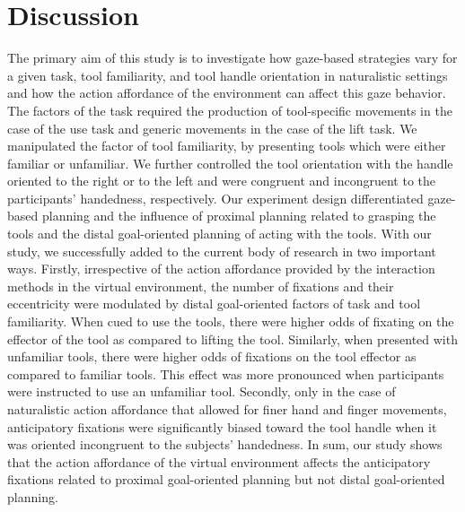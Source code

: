 \section{Discussion}

The primary aim of this study is to investigate how gaze-based strategies vary for a given task, tool familiarity, and tool handle orientation in naturalistic settings and how the action affordance of the environment can affect this gaze behavior. The factors of the task required the production of tool-specific movements in the case of the use task and generic movements in the case of the lift task. We manipulated the factor of tool familiarity, by presenting tools which were either familiar or unfamiliar. We further controlled the tool orientation with the handle oriented to the right or to the left and were congruent and incongruent to the participants' handedness, respectively. Our experiment design differentiated gaze-based planning and the influence of proximal planning related to grasping the tools and the distal goal-oriented planning of acting with the tools. With our study, we successfully added to the current body of research in two important ways. Firstly, irrespective of the action affordance provided by the interaction methods in the virtual environment, the number of fixations and their eccentricity were modulated by distal goal-oriented factors of task and tool familiarity. When cued to use the tools, there were higher odds of fixating on the effector of the tool as compared to lifting the tool. Similarly, when presented with unfamiliar tools, there were higher odds of fixations on the tool effector as compared to familiar tools. This effect was more pronounced when participants were instructed to use an unfamiliar tool. Secondly, only in the case of naturalistic action affordance that allowed for finer hand and finger movements, anticipatory fixations were significantly biased toward the tool handle when it was oriented incongruent to the subjects' handedness. In sum, our study shows that the action affordance of the virtual environment affects the anticipatory fixations related to proximal goal-oriented planning but not distal goal-oriented planning.

